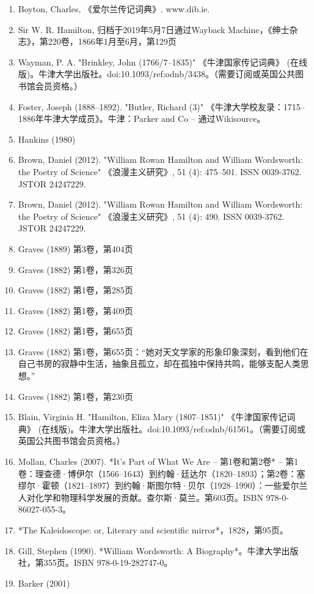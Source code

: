 \begin{enumerate}
\item Boyton, Charles, 《爱尔兰传记词典》. www.dib.ie.  
\item Sir W. R. Hamilton, 归档于2019年5月7日通过Wayback Machine，《绅士杂志》，第220卷，1866年1月至6月，第129页  
\item Wayman, P. A. "Brinkley, John (1766/7–1835)" 《牛津国家传记词典》 (在线版)。牛津大学出版社。doi:10.1093/ref:odnb/3438。（需要订阅或英国公共图书馆会员资格。）  
\item Foster, Joseph (1888–1892). "Butler, Richard (3)" 《牛津大学校友录：1715–1886年牛津大学成员》。牛津：Parker and Co – 通过Wikisource。  
\item Hankins (1980)  
\item Brown, Daniel (2012). "William Rowan Hamilton and William Wordsworth: the Poetry of Science" 《浪漫主义研究》, 51 (4): 475–501. ISSN 0039-3762. JSTOR 24247229.  
\item Brown, Daniel (2012). "William Rowan Hamilton and William Wordsworth: the Poetry of Science" 《浪漫主义研究》, 51 (4): 490. ISSN 0039-3762. JSTOR 24247229.  
\item Graves (1889) 第3卷，第404页  
\item Graves (1882) 第1卷，第326页  
\item Graves (1882) 第1卷，第285页  
\item Graves (1882) 第1卷，第409页  
\item Graves (1882) 第1卷，第655页  
\item Graves (1882) 第1卷，第655页：“她对天文学家的形象印象深刻，看到他们在自己书房的寂静中生活，抽象且孤立，却在孤独中保持共鸣，能够支配人类思想。”  
\item Graves (1882) 第1卷，第230页
\item Blain, Virginia H. "Hamilton, Eliza Mary (1807–1851)" 《牛津国家传记词典》 (在线版)。牛津大学出版社。doi:10.1093/ref:odnb/61561。（需要订阅或英国公共图书馆会员资格。）  
\item Mollan, Charles (2007). *It’s Part of What We Are – 第1卷和第2卷* – 第1卷：理查德·博伊尔（1566–1643）到约翰·廷达尔（1820–1893）；第2卷：塞缪尔·霍顿（1821–1897）到约翰·斯图尔特·贝尔（1928–1990）：一些爱尔兰人对化学和物理科学发展的贡献。查尔斯·莫兰。第603页。ISBN 978-0-86027-055-3。  
\item *The Kaleidoscope: or, Literary and scientific mirror*，1828，第95页。  
\item Gill, Stephen (1990). *William Wordsworth: A Biography*。牛津大学出版社，第355页。ISBN 978-0-19-282747-0。  
\item Barker (2001)  

\end{enumerate}
